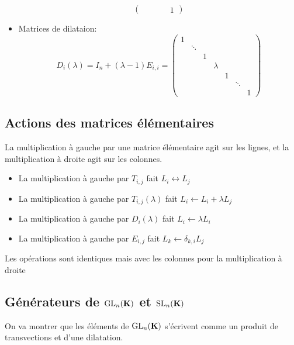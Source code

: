 \begin{dfn}
\begin{itemize}
\[\begin{pmatrix}
          &   &        &         & 1
    \end{pmatrix}
    \] 
\item Matrices de dilataion: \[
    D_i(\lambda)=I_n+(\lambda-1)E_{i,i}= \begin{pmatrix}
        1   &        &   &         &   &        & \\
            & \ddots &   &         &   &        & \\
            &        & 1 &         &   &        & \\
            &        &   & \lambda &   &        & \\
            &        &   &         & 1 &        & \\
            &        &   &         &   & \ddots & \\
            &        &   &         &   &        & 1
    \end{pmatrix}
\] 
    \end{itemize}
\end{dfn}

\subsection{Actions des matrices élémentaires}

La multiplication à gauche par une matrice élémentaire agit sur les lignes, et la multiplication à droite agit sur les colonnes. \begin{itemize}
    \item La multiplication à gauche par $T_{i,j}$ fait $L_i \leftrightarrow L_j$
    \item La multiplication à gauche par $T_{i,j}(\lambda)$ fait $L_i \leftarrow L_i+\lambda L_j$
    \item La multiplication à gauche par $D_i(\lambda)$ fait  $L_i \leftarrow \lambda L_i$
    \item La multiplication à gauche par $E_{i,j}$ fait $L_k \leftarrow \delta_{k,i}L_j$
\end{itemize}
Les opérations sont identiques mais avec les colonnes pour la multiplication à droite

\subsection{Générateurs de \texorpdfstring{$\mathrm{GL}_n(\mathbf K)$ }{GLn(K)} et \texorpdfstring{$\mathrm{SL}_n(\mathbf K)$ }{SLn(K)}}

On va montrer que les éléments de $\mathrm{GL}_n(\mathbf K)$ s'écrivent comme un produit de transvections et d'une dilatation.

